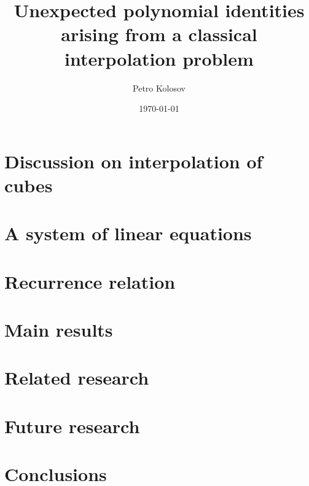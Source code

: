 \documentclass[12pt,letterpaper,oneside,reqno]{amsart}
\title[Unexpected polynomial identities arising from a class. interpolation problem]
{Unexpected polynomial identities arising from a classical interpolation problem}
\author[Petro Kolosov]{Petro Kolosov}
\date{\today}
\begin{document}
    \maketitle

    \begin{abstract}
        
    \end{abstract}

    \tableofcontents


    \section{Discussion on interpolation of cubes}
    \label{sec:the-problem-of-interpolation-of-cubes}
    


    \section{A system of linear equations}
    \label{sec:system-of-linear-equations-approach}
    


    \section{Recurrence relation}
    \label{sec:recurrence-relation-approach}
    


    \section{Main results}
    \label{sec:main-results}
    


    \section{Related research}\label{sec:related-research}
    


    \section{Future research}\label{sec:future-research}
    


    \section{Conclusions}\label{sec:conclusions}
    
\end{document}
